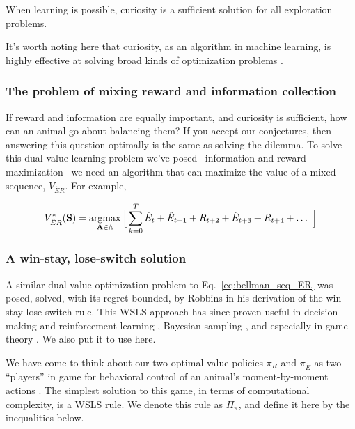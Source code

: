 \begin{conjecture}
	When learning is possible, curiosity is a sufficient solution for all exploration problems.
\end{conjecture}

It's worth noting here that curiosity, as an algorithm in machine learning, is highly effective at solving broad kinds of optimization problems \cite{Schmidhuber1991,Stanton2018,Lehman2010,Mouret2011,Fister2019,Mouret2015,Colas2020,Cully2015,Pathak2017,Laversanne-Finot2018}. 

\subsubsection*{The problem of mixing reward and information collection}
If reward and information are equally important, and curiosity is sufficient, how can an animal go about balancing them? If you accept our conjectures, then answering this question optimally is the same as solving the dilemma. To solve this dual value learning problem we’ve posed–-information and reward maximization–-we need an algorithm that can maximize the value of a mixed sequence, $V_{\hat{E}R}$. For example,

\begin{equation}
	\label{eq:bellman_seq_ER}
	V^*_{\hat{E}R}(\mathbf{S}) = \operatorname*{argmax}_{\mathbf{A} \in \mathbb{A}} \Big [\sum_{k=0}^{T} \hat{E}_t + \hat{E}_{t+1} + R_{t+2} + \hat{E}_{t+3} + R_{t+4} + \ldots  \ \Big ]
\end{equation}

\subsubsection*{A win-stay, lose-switch solution}
A similar dual value optimization problem to Eq.~\ref{eq:bellman_seq_ER} was posed, solved, with its regret bounded, by Robbins \cite{Robbins1952} in his derivation of the win-stay lose-switch rule. This WSLS approach has since proven useful in decision making and reinforcement learning \cite{Estes1994TowardAS,Worthy2014}, Bayesian sampling \cite{Bonawitz2014}, and especially in game theory \cite{Nowak1993}. We also put it to use here. 

We have come to think about our two optimal value policies $\pi_R$ and $\pi_{\hat E}$ as two ``players'' in game for behavioral control of an animal's moment-by-moment actions \cite{Estes1994TowardAS}. The simplest solution to this game, in terms of computational complexity, is a WSLS rule. We denote this rule as $\Pi_\pi$, and define it here by the inequalities below. 

